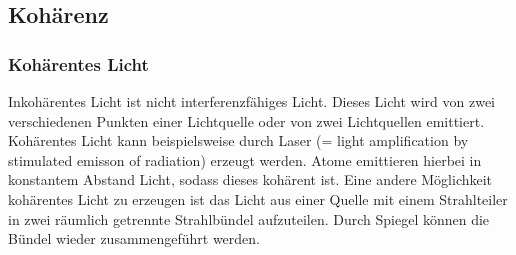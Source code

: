 
\subsection{Kohärenz}
\subsubsection{Kohärentes Licht}
Inkohärentes Licht ist nicht interferenzfähiges Licht. Dieses Licht wird von zwei
verschiedenen Punkten einer Lichtquelle oder von zwei Lichtquellen emittiert.
\newline
Kohärentes Licht kann beispielsweise durch Laser (= light amplification by stimulated emisson of radiation)
erzeugt werden. Atome emittieren hierbei in konstantem Abstand Licht, sodass dieses 
kohärent ist.
\newline
Eine andere Möglichkeit kohärentes Licht zu erzeugen ist das Licht aus einer Quelle
mit einem Strahlteiler in zwei räumlich getrennte Strahlbündel aufzuteilen.
Durch Spiegel können die Bündel wieder zusammengeführt werden.

